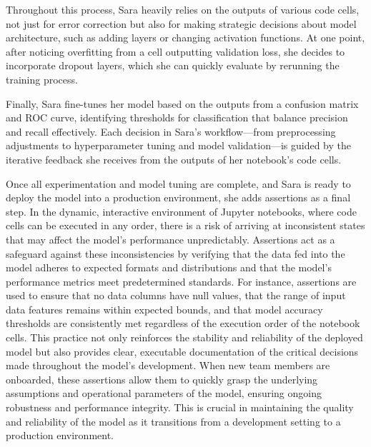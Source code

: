 Throughout this process, Sara heavily relies on the outputs of various code cells, not just for error correction but also for making strategic decisions about model architecture, such as adding layers or changing activation functions. At one point, after noticing overfitting from a cell outputting validation loss, she decides to incorporate dropout layers, which she can quickly evaluate by rerunning the training process.

Finally, Sara fine-tunes her model based on the outputs from a confusion matrix and ROC curve, identifying thresholds for classification that balance precision and recall effectively. Each decision in Sara's workflow—from preprocessing adjustments to hyperparameter tuning and model validation—is guided by the iterative feedback she receives from the outputs of her notebook's code cells.

Once all experimentation and model tuning are complete, and Sara is ready to deploy the model into a production environment, she adds assertions as a final step. In the dynamic, interactive environment of Jupyter notebooks, where code cells can be executed in any order, there is a risk of arriving at inconsistent states that may affect the model's performance unpredictably. Assertions act as a safeguard against these inconsistencies by verifying that the data fed into the model adheres to expected formats and distributions and that the model's performance metrics meet predetermined standards. For instance, assertions are used to ensure that no data columns have null values, that the range of input data features remains within expected bounds, and that model accuracy thresholds are consistently met regardless of the execution order of the notebook cells. This practice not only reinforces the stability and reliability of the deployed model but also provides clear, executable documentation of the critical decisions made throughout the model's development. When new team members are onboarded, these assertions allow them to quickly grasp the underlying assumptions and operational parameters of the model, ensuring ongoing robustness and performance integrity. This is crucial in maintaining the quality and reliability of the model as it transitions from a development setting to a production environment.

